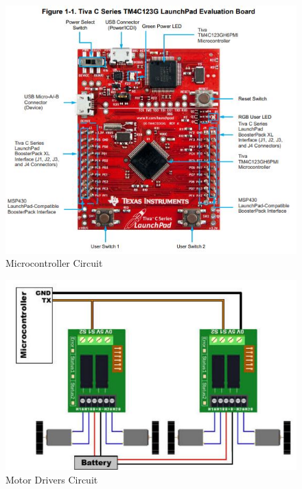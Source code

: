 
\begin{figure}[h!]
	\centering
 	\includegraphics[width=1.00\textwidth]{images/circuits/1_redboard.jpg}
 \caption{Microcontroller Circuit}
 \label{fig:Microcontroller Circuit}
\end{figure}

\begin{figure}[h!]
	\centering
 	\includegraphics[width=1.00\textwidth]{images/circuits/2_sabertooth.JPG}
 \caption{Motor Drivers Circuit}
 \label{fig:Motor Drivers Circuit}
\end{figure}

